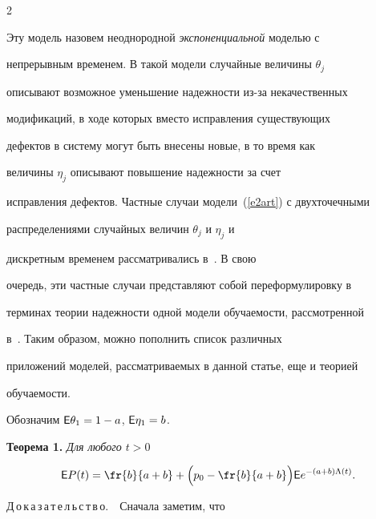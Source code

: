 \begin{multicols}{2}
\begin{equation}
\end{equation}


Эту модель назовем неоднородной {\it экспоненциальной} моделью с


непрерывным временем. В такой модели случайные величины $\theta_j$


описывают возможное уменьшение надежности из-за некачественных


модификаций, в ходе которых вместо исправления существующих


дефектов в систему могут быть внесены новые, в то время как


величины $\eta_j$ описывают повышение надежности за счет


исправления дефектов. Частные случаи модели~(\ref{e2art}) с двухточечными


распределениями случайных величин $\theta_j$ и $\eta_j$ и


дискретным временем рассматривались в~\cite{5art, 6art}. В свою


очередь, эти частные случаи представляют собой переформулировку в


терминах теории надежности одной модели обучаемости, рассмотренной


в~\cite{7art}. Таким образом, можно пополнить список различных


приложений моделей, рассматриваемых в данной статье, еще и теорией


обучаемости.





Обозначим ${\sf E}\theta_1=1-a$, ${\sf E}\eta_1=b$.





\smallskip





\noindent


\textbf{Теорема 1.} {\it Для любого $t>0$}


$$


{\sf E}P(t)=\fr{b}{a+b}+\Big(p_0-\fr{b}{a+b}\Big){\sf


E}e^{-(a+b)\Lambda(t)}.


$$





\smallskip





\noindent


Д\,о\,к\,а\,з\,а\,т\,е\,л\,ь\,с\,т\,в\,о.\ $\,$ Сначала заметим, что



\end{multicols}

